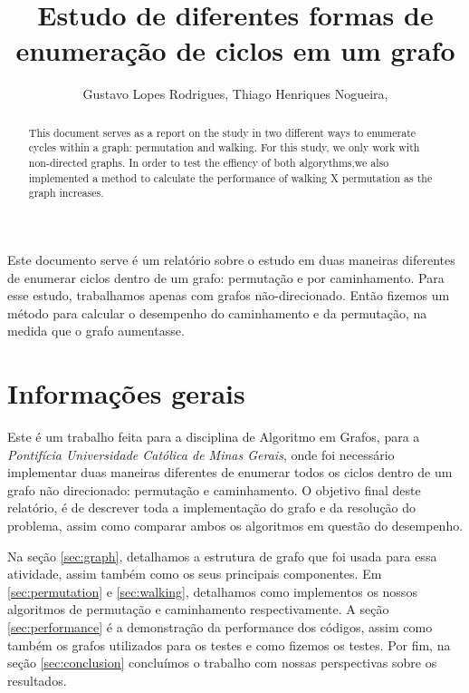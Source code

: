 \documentclass[12pt]{article}
\title{Estudo de diferentes formas de enumeração de ciclos em um grafo}
\author{Gustavo Lopes Rodrigues\inst{1}, Thiago Henriques Nogueira\inst{2},}
\begin{document}
 

  \maketitle

  \begin{abstract} 
    This document serves as a report on the study in two different ways
    to enumerate cycles within a graph: permutation and walking. For this
    study, we only work with non-directed graphs. In order to test the effiency 
    of both algorythms,we also implemented a method to calculate the performance of walking
    X permutation as the graph increases.
  \end{abstract}

  \begin{resumo} 
    Este documento serve é um relatório sobre o estudo em duas maneiras 
    diferentes de enumerar ciclos dentro de um grafo: permutação e por caminhamento. Para esse 
    estudo, trabalhamos apenas com grafos não-direcionado. Então fizemos um método
    para calcular o desempenho do caminhamento e da permutação, na medida que o grafo aumentasse.
  \end{resumo}


  \section{Informações gerais}

    Este é um trabalho feita para a disciplina de Algoritmo em Grafos, para a 
    \emph{Pontifícia Universidade Católica de Minas Gerais}, onde foi necessário 
    implementar duas maneiras diferentes de enumerar todos os ciclos dentro de um 
    grafo não direcionado: permutação e caminhamento. O objetivo final  deste relatório, 
    é de descrever toda a implementação do grafo e da resolução do problema, assim como 
    comparar ambos os algoritmos em questão do desempenho.

    Na seção \ref{sec:graph}, detalhamos a estrutura de grafo que foi usada para essa atividade,
    assim também como os seus principais componentes. Em \ref{sec:permutation} e \ref{sec:walking},
    detalhamos como implementos os nossos algoritmos de permutação e caminhamento respectivamente.
    A seção \ref{sec:performance} é a demonstração da performance dos códigos, assim como também 
    os grafos utilizados para os testes e como fizemos os testes. Por fim, na seção \ref{sec:conclusion}
    concluímos o trabalho com nossas perspectivas sobre os resultados.
\end{document}
